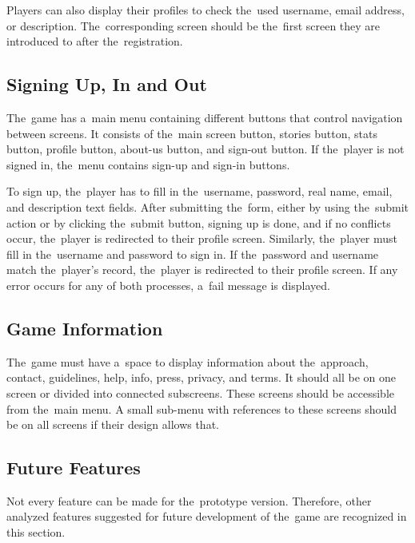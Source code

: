 Players can also display their profiles to check the~used username, email \mbox{address}, or description.
The~corresponding screen should be the~first screen they are introduced to after the~registration.

\subsection{Signing Up, In and Out}
\label{analysis:game:sign-up-in-out}

The~game has a~main menu containing different buttons that control navigation between screens.
It consists of the~main screen button, stories \mbox{button}, stats button, profile button, about-us button, and sign-out button.
\linebreak
If the~player is not signed in, the~menu contains sign-up and sign-in buttons.

To sign up, the~player has to fill in the~username, password, real name, email, and description text fields.
After submitting the~form, either by using the~submit action or by clicking the~submit button, signing up is done, and if no conflicts occur, the~player is redirected to their profile screen.
Similarly, the~player must fill in the~username and password to sign in.
If the~password and username match the~player's record, the~player is redirected to their profile screen.
If any error occurs for any of both processes, a~fail message is displayed.

\subsection{Game Information}
\label{analysis:game:game-information}

The~game must have a~space to display information about the~approach, \mbox{contact}, guidelines, help, info, press, privacy, and terms.
It should all be on one screen or divided into connected subscreens.
These screens should be accessible from the~main menu.
A small sub-menu with references to these screens should be on all screens if their design allows that.

\subsection{Future Features}
\label{analysis:game:future-features}

Not every feature can be made for the~prototype version.
Therefore, other analyzed features suggested for future development of the~game are recognized in this section.

